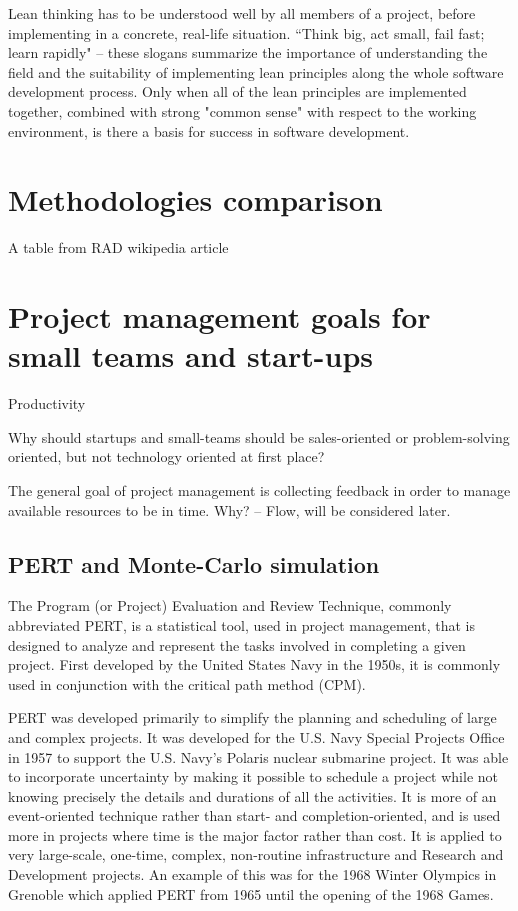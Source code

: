 Lean thinking has to be understood well by all members of a project, before implementing in a concrete, real-life situation. ``Think big, act small, fail fast; learn rapidly" – these slogans summarize the importance of understanding the field and the suitability of implementing lean principles along the whole software development process. Only when all of the lean principles are implemented together, combined with strong "common sense" with respect to the working environment, is there a basis for success in software development.

\section{Methodologies comparison}

A table from RAD wikipedia article

\section{Project management goals for small teams and start-ups}

Productivity

Why should startups and small-teams should be sales-oriented or problem-solving oriented, but not technology oriented at first place? 

The general goal of project management is collecting feedback in order to manage available resources to be in time. Why? -- Flow, will be considered later.

\subsection{PERT and Monte-Carlo simulation}

%
%

The Program (or Project) Evaluation and Review Technique, commonly abbreviated PERT, is a statistical tool, used in project management, that is designed to analyze and represent the tasks involved in completing a given project. First developed by the United States Navy in the 1950s, it is commonly used in conjunction with the critical path method (CPM).

PERT was developed primarily to simplify the planning and scheduling of large and complex projects. It was developed for the U.S. Navy Special Projects Office in 1957 to support the U.S. Navy's Polaris nuclear submarine project. It was able to incorporate uncertainty by making it possible to schedule a project while not knowing precisely the details and durations of all the activities. It is more of an event-oriented technique rather than start- and completion-oriented, and is used more in projects where time is the major factor rather than cost. It is applied to very large-scale, one-time, complex, non-routine infrastructure and Research and Development projects. An example of this was for the 1968 Winter Olympics in Grenoble which applied PERT from 1965 until the opening of the 1968 Games.

